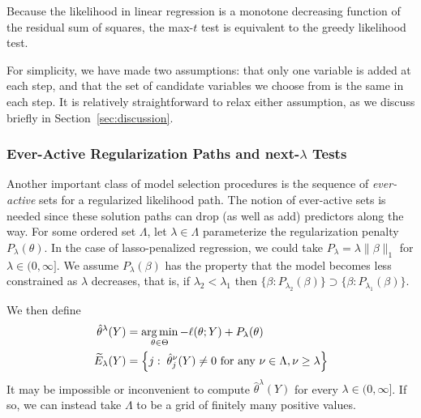 \documentclass{article}
\begin{document}
Because the likelihood in linear regression is a monotone decreasing function of the residual sum of squares, the max-$t$ test is equivalent to the greedy likelihood test.

For simplicity, we have made two assumptions: that only one variable is added at each step, and that the set of candidate variables we choose from is the same in each step. It is relatively straightforward to relax either assumption, as we discuss briefly in Section~\ref{sec:discussion}.

\subsubsection{Ever-Active Regularization Paths and next-$\lambda$ Tests}
Another important class of model selection procedures is the sequence of {\em ever-active} sets for a regularized likelihood path. 
The notion of ever-active sets is needed since these solution paths can drop  (as well as add) predictors along the way. 	For some ordered set $\Lambda$, let $\lambda\in\Lambda$ parameterize the regularization penalty $P_\lambda(\theta)$. In the case of lasso-penalized regression, we could take $P_\lambda = \lambda\|\beta\|_1$ for $\lambda\in (0,\infty]$. 
We assume $P_\lambda(\beta)$  has the property  that the model becomes less constrained as $\lambda$ decreases, that is,
 if $\lambda_2<\lambda_1$ then $\{\beta:P_{\lambda_2}(\beta)\} \supset \{\beta:P_{\lambda_1}(\beta)\}$.   


We then define
\begin{align}
  \hat\theta^{\lambda}(Y) &= 
  \operatorname*{arg\,min}_{\theta\in\Theta} -\ell(\theta; Y) + P_\lambda(\theta) \\
  \widetilde{E}_\lambda(Y) &= \left\{j:\; \hat\theta_j^\nu(Y) \neq 0 
    \text{ for any } \nu\in \Lambda, \nu \geq \lambda \right\}
\end{align}
It may be impossible or inconvenient to compute $\hat\theta^\lambda(Y)$ for every $\lambda\in(0,\infty]$. If so, we can instead take $\Lambda$ to be a grid of finitely many positive values.
\end{document}
